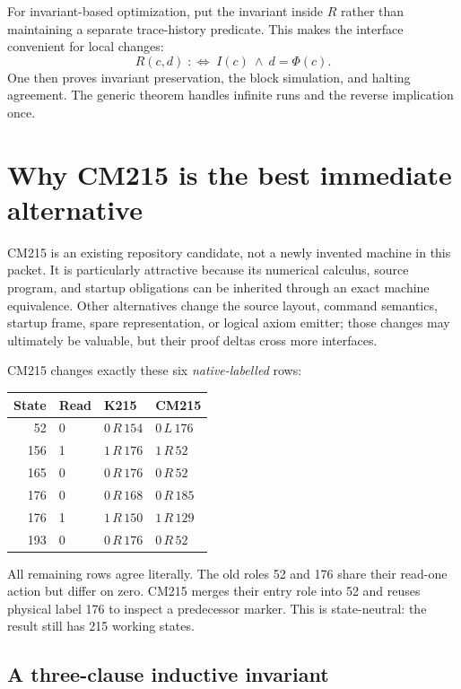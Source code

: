 \documentclass[11pt]{article}
\begin{document}
For invariant-based optimization, put the invariant inside $R$ rather than maintaining a separate trace-history predicate. This makes the interface convenient for local changes:
\[
 R(c,d)\;:\Longleftrightarrow\; I(c)\ \land\ d=\Phi(c).
\]
One then proves invariant preservation, the block simulation, and halting agreement. The generic theorem handles infinite runs and the reverse implication once.

\section{Why CM215 is the best immediate alternative}

CM215 is an existing repository candidate, not a newly invented machine in this packet. It is particularly attractive because its numerical calculus, source program, and startup obligations can be inherited through an exact machine equivalence. Other alternatives change the source layout, command semantics, startup frame, spare representation, or logical axiom emitter; those changes may ultimately be valuable, but their proof deltas cross more interfaces.

CM215 changes exactly these six \emph{native-labelled} rows:
\begin{center}
\begin{tabular}{@{}rlll@{}}
\toprule
State & Read & K215 & CM215 \\
\midrule
52 & 0 & $0\,R\,154$ & $0\,L\,176$ \\
156 & 1 & $1\,R\,176$ & $1\,R\,52$ \\
165 & 0 & $0\,R\,176$ & $0\,R\,52$ \\
176 & 0 & $0\,R\,168$ & $0\,R\,185$ \\
176 & 1 & $1\,R\,150$ & $1\,R\,129$ \\
193 & 0 & $0\,R\,176$ & $0\,R\,52$ \\
\bottomrule
\end{tabular}
\end{center}
All remaining rows agree literally. The old roles 52 and 176 share their read-one action but differ on zero. CM215 merges their entry role into 52 and reuses physical label 176 to inspect a predecessor marker. This is state-neutral: the result still has 215 working states.

\subsection{A three-clause inductive invariant}
\end{document}
